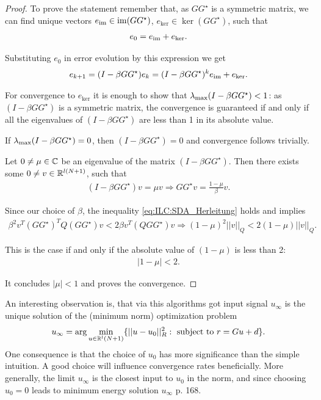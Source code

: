 \begin{proof}

To prove the statement remember that, as $GG^\star$ is a symmetric matrix, we can find unique vectors 
$e_{\operatorname{im}} \in \operatorname{im}(G G^\star)$, $e_{\ker} \in \ker(G G^\star)$, such that 
\begin{align}
e_0 = e_{\operatorname{im}} + e_{\ker}.
\end{align}


Substituting $e_0$ in error evolution by this expression we get  
\begin{align}
e_{k+1} = (I - \beta G G^\star) e_k = (I - \beta G G^\star)^k e_{\operatorname{im}} + e_{\ker}.
\end{align}

For convergence to $e_{\ker}$ it is enough  to show that $\lambda_{\mathrm{max}}(I - \beta G G^\star) < 1$: as $(I - \beta G G^\star)$ is a symmetric matrix, the convergence is guaranteed if and only if all the eigenvalues of $(I - \beta G G^\star)$ are less than 1 in its absolute value. 

If $\lambda_{\mathrm{max}}(I - \beta G G^\star) = 0$, then $(I - \beta G G^\star) = 0$  and convergence follows trivially. 

Let $0 \neq \mu \in {\mathbb{C}}$ be an eigenvalue of the matrix $(I - \beta G G^{\star})$. Then there exists some $0 \neq v \in {\mathbb{R}}^{l (N+1)}$, such that 
\begin{align}
	(I -\beta G G^{\star})v = \mu v \Rightarrow G G^{\star} v = \frac{1 - \mu}{\beta}v. 
\end{align}

Since our choice of $\beta$, the inequality \eqref{eq:ILC:SDA_Herleitung} holds and implies 
\begin{align}
\beta^2 v^T (G G^\star)^T Q (G G^\star) v < 2\beta v^T(Q G G^\star)v 
\Rightarrow (1 - \mu)^2 ||v||_Q < 2 (1 - \mu) ||v||_Q. 
\end{align}

This is the case if and only if the absolute value of $(1 - \mu)$ is less than 2: 
\begin{align}
|1 - \mu| < 2. 
\end{align}

It concludes $|\mu|<1$ and proves the convergence. 
\end{proof}



An interesting observation is, that via this algorithms got input signal $u_\infty$ is the unique solution of the (minimum norm) optimization problem 
\begin{align}
u_\infty = \arg \min_{u \in {\mathbb{R}}^l(N+1)} \{|| u - u_0||_R^2: \text{ subject to } r = Gu + d\}.
\end{align}
One consequence is that the choice of $u_0$ has more significance than the simple intuition. A good choice will influence convergence rates beneficially. More generally, the limit $u_\infty$ is the closest input to $u_0$ in the norm, and since choosing $u_0 = 0$ leads to minimum energy solution $u_\infty$ \cite{ILC} p. 168. 

